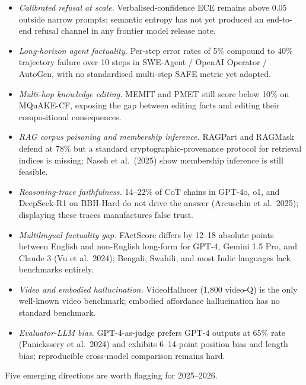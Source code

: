 \documentclass{article}
\begin{document}
\begin{itemize}

\item
  \emph{Calibrated refusal at scale.} Verbalised-confidence ECE remains above 0.05 outside narrow prompts; semantic entropy has not yet produced an end-to-end refusal channel in any frontier model release note.
\item
  \emph{Long-horizon agent factuality.} Per-step error rates of 5\% compound to 40\% trajectory failure over 10 steps in SWE-Agent / OpenAI Operator / AutoGen, with no standardised multi-step SAFE metric yet adopted.
\item
  \emph{Multi-hop knowledge editing.} MEMIT and PMET still score below 10\% on MQuAKE-CF, exposing the gap between editing facts and editing their compositional consequences.
\item
  \emph{RAG corpus poisoning and membership inference.} RAGPart and RAGMask defend at 78\% but a standard cryptographic-provenance protocol for retrieval indices is missing; Naseh et al.~(2025) show membership inference is still feasible.
\item
  \emph{Reasoning-trace faithfulness.} 14--22\% of CoT chains in GPT-4o, o1, and DeepSeek-R1 on BBH-Hard do not drive the answer (Arcuschin et al.~2025); displaying these traces manufactures false trust.
\item
  \emph{Multilingual factuality gap.} FActScore differs by 12--18 absolute points between English and non-English long-form for GPT-4, Gemini 1.5 Pro, and Claude 3 (Vu et al.~2024); Bengali, Swahili, and most Indic languages lack benchmarks entirely.
\item
  \emph{Video and embodied hallucination.} VideoHallucer (1,800 video-Q) is the only well-known video benchmark; embodied affordance hallucination has no standard benchmark.
\item
  \emph{Evaluator-LLM bias.} GPT-4-as-judge prefers GPT-4 outputs at 65\% rate (Panickssery et al.~2024) and exhibits 6--14-point position bias and length bias; reproducible cross-model comparison remains hard.
\end{itemize}

Five emerging directions are worth flagging for 2025--2026.
\end{document}
